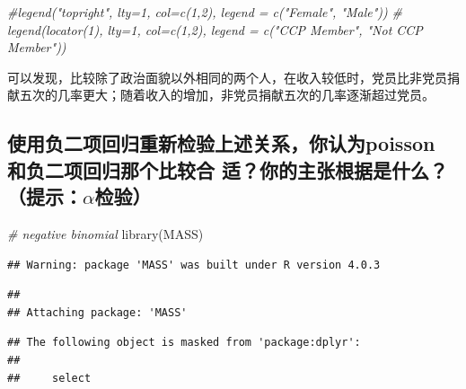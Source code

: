 \documentclass[
]{ctexart}
\newenvironment{Shaded}{\begin{snugshade}}{\end{snugshade}}
\newcommand{\CommentTok}[1]{\textcolor[rgb]{0.56,0.35,0.01}{\textit{#1}}}
\newcommand{\FunctionTok}[1]{\textcolor[rgb]{0.00,0.00,0.00}{#1}}
\newcommand{\NormalTok}[1]{#1}
\begin{document}
\begin{Shaded}
\begin{Highlighting}[]
\CommentTok{\#legend("topright", lty=1, col=c(1,2), legend = c("Female", "Male"))}
\CommentTok{\# legend(locator(1), lty=1, col=c(1,2), legend = c("CCP Member", "Not CCP Member"))}
\end{Highlighting}
\end{Shaded}

可以发现，比较除了政治面貌以外相同的两个人，在收入较低时，党员比非党员捐献五次的几率更大；随着收入的增加，非党员捐献五次的几率逐渐超过党员。

\hypertarget{ux4f7fux7528ux8d1fux4e8cux9879ux56deux5f52ux91cdux65b0ux68c0ux9a8cux4e0aux8ff0ux5173ux7cfbux4f60ux8ba4ux4e3apoisson-ux548cux8d1fux4e8cux9879ux56deux5f52ux90a3ux4e2aux6bd4ux8f83ux5408-ux9002ux4f60ux7684ux4e3bux5f20ux6839ux636eux662fux4ec0ux4e48ux63d0ux793aalphaux68c0ux9a8c}{%
\subsection{\texorpdfstring{使用负二项回归重新检验上述关系，你认为poisson
和负二项回归那个比较合
适？你的主张根据是什么？（提示：\(\alpha\)检验）}{使用负二项回归重新检验上述关系，你认为poisson 和负二项回归那个比较合 适？你的主张根据是什么？（提示：\textbackslash alpha检验）}}\label{ux4f7fux7528ux8d1fux4e8cux9879ux56deux5f52ux91cdux65b0ux68c0ux9a8cux4e0aux8ff0ux5173ux7cfbux4f60ux8ba4ux4e3apoisson-ux548cux8d1fux4e8cux9879ux56deux5f52ux90a3ux4e2aux6bd4ux8f83ux5408-ux9002ux4f60ux7684ux4e3bux5f20ux6839ux636eux662fux4ec0ux4e48ux63d0ux793aalphaux68c0ux9a8c}}

\begin{Shaded}
\begin{Highlighting}[]
\CommentTok{\# negative binomial}
\FunctionTok{library}\NormalTok{(MASS)}
\end{Highlighting}
\end{Shaded}

\begin{verbatim}
## Warning: package 'MASS' was built under R version 4.0.3
\end{verbatim}

\begin{verbatim}
## 
## Attaching package: 'MASS'
\end{verbatim}

\begin{verbatim}
## The following object is masked from 'package:dplyr':
## 
##     select
\end{verbatim}
\end{document}
